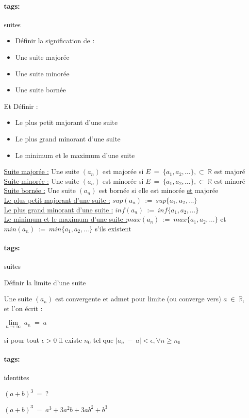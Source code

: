 \documentclass[12pt]{article}
\newcommand*{\xfield}[1]{\begin{mdframed}\centering #1\end{mdframed}\bigskip}
\newenvironment{note}{}{}
\newcommand*{\tags}[1]{\paragraph{tags: }#1}
\begin{document}
\begin{note}
	\tags{suites}
    \xfield{
        \begin{itemize}
        \item Définir la signification de :
        \item Une suite majorée
        \item Une suite minorée
        \item Une suite bornée
        \end{itemize}
        Et Définir :
        \begin{itemize}
        \item Le plus petit majorant d'une suite
        \item Le plus grand minorant d'une suite
        \item Le minimum et le maximum d'une suite
        \end{itemize}
    }
    \xfield{
        \underline{Suite majorée :} Une suite $(a_n)$ est majorée si $E\ =\ \{a_1,a_2,...\}, \subset\ \mathbb{R}$ est majoré\\
        \underline{Suite minorée :} Une suite $(a_n)$ est minorée si $E\ =\ \{a_1,a_2,...\}, \subset\ \mathbb{R}$ est minoré\\
        \underline{Suite bornée :} Une suite $(a_n)$ est bornée si elle est minorée \underline{et} majorée\\
        \underline{Le plus petit majorant d'une suite :} $sup(a_n)\ :=\ sup\{a_1,a_2,...\}$\\
        \underline{Le plus grand minorant d'une suite :} $inf(a_n)\ :=\ inf\{a_1,a_2,...\}$\\
        \underline{Le minimum et le maximum d'une suite :}$max(a_n)\ :=\ max\{a_1,a_2,...\}$ et $min(a_n)\ :=\ min\{a_1,a_2,...\}$ s'ils existent
    }
\end{note}

\begin{note}
	\tags{suites}
    \xfield{Définir la limite d'une suite}
    \xfield{
        Une suite $(a_n)$ est convergente et admet pour limite (ou converge vers) $a\ \in\ \mathbb{R}$, et l'on écrit :\\
        \begin{center}
        $\lim\limits_{n \to \infty}\ a_n\ =\ a$
        \end{center}
        si pour tout $\epsilon >0$ il existe $n_0$ tel que $|a_n\ -\ a| < \epsilon, \forall n \ge n_0$
    }
\end{note}

\begin{note}
	\tags{identites}
    \xfield{$(a+b)^3\ =\ ?$}
    \xfield{$(a+b)^3\ =\ a^3 + 3a^2b+3ab^2+b^3$}
\end{note}
\end{document}
